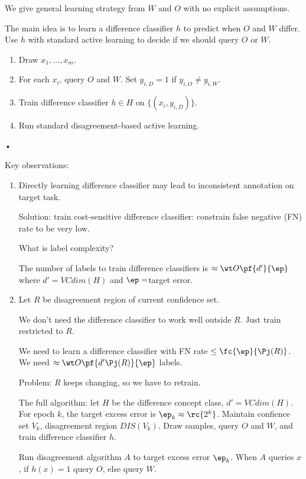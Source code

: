 We give general learning strategy from $W$ and $O$ with no explicit assumptions.



The main idea is to learn a difference classifier $h$ to predict when $O$ and $W$ differ. Use $h$ with standard active learning to decide if we should query $O$ or $W$.

\begin{enumerate}
\item
Draw $x_1,\ldots, x_m$. 
\item
For each $x_i$, query $O$ and $W$. Set $y_{i,D}=1$ if $y_{i,O} \ne y_{i,W}$. 
\item
Train difference classifier $h\in H$ on $\{(x_i,y_{i,D})\}$.
\item
Run standard disagreement-based active learning.
\end{enumerate}•


Key observations:
\begin{enumerate}
\item
Directly learning difference classifier may lead to inconsistent annotation on target task.

Solution: train cost-sensitive difference classifier: constrain false negative (FN) rate to be very low.

What is label complexity?

The number of labels to train difference classifiers is $\approx \wt O\pf{d'}{\ep}$ where $d'=VCdim(H)$ and $\ep=$target error.
\item
Let $R$ be disagreement region of current confidence set.

We don't need the difference classifier  to work well outside $R$. Just train restricted to $R$.

We need to learn a difference classifier with FN rate $\le \fc{\ep}{\Pj(R)}$. We need $\approx \wt O\pf{d'\Pj(R)}{\ep}$ labels.

Problem: $R$ keeps changing, so we have to retrain.

The full algorithm: let $H$ be the difference concept class, $d'=VCdim(H)$. For epoch $k$, the target excess error is $\ep_k\approx \rc{2^k}$. Maintain confience set $V_k$, disagreement region $DIS(V_k)$. Draw samples, query $O$ and $W$, and train difference classifier $h$.

Run disagreement algorithm $A$ to target excess error $\ep_k$. When $A$ queries $x$, if $h(x)=1$ query $O$, else query $W$.
\end{enumerate}

